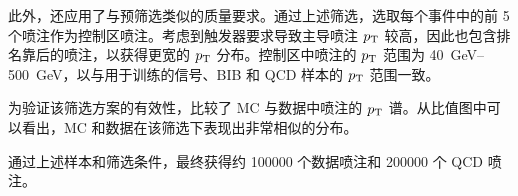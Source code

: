 此外，还应用了与预筛选类似的质量要求。通过上述筛选，选取每个事件中的前 5 个喷注作为控制区喷注。考虑到触发器要求导致主导喷注 $p_{\text{T}}$ 较高，因此也包含排名靠后的喷注，以获得更宽的 $p_{\text{T}}$ 分布。控制区中喷注的 $p_{\text{T}}$ 范围为 \SI{40}{GeV}–\SI{500}{GeV}，以与用于训练的信号、BIB 和 QCD 样本的 $p_{\text{T}}$ 范围一致。

为验证该筛选方案的有效性，比较了 MC 与数据中喷注的 $p_{\text{T}}$ 谱。从比值图中可以看出，MC 和数据在该筛选下表现出非常相似的分布。

通过上述样本和筛选条件，最终获得约 \num{100000} 个数据喷注和 \num{200000} 个 QCD 喷注。
